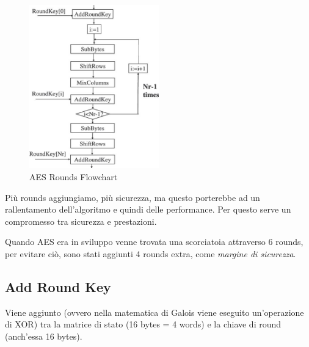 \begin{figure}[H]
	\centering
	\includegraphics[width=0.5\textwidth, height=0.5\textheight, keepaspectratio]{./images/aes/flowcharts/aes_flowchart.png}
	\caption{AES Rounds Flowchart}
	\label{fig:aes_flowchart2}
\end{figure}


\textsf{\small Più rounds aggiungiamo, più sicurezza, ma questo porterebbe ad un rallentamento dell'algoritmo e quindi delle performance.}
\textsf{\small Per questo serve un compromesso tra sicurezza e prestazioni.}

 

\textsf{\small Quando AES era in sviluppo venne trovata una scorciatoia attraverso 6 rounds, per evitare ciò, sono stati aggiunti 4 rounds extra, come \emph{margine di sicurezza}.} %

\subsection{Add Round Key}

    

\textsf{\small Viene aggiunto (ovvero nella matematica di Galois viene eseguito un'operazione di XOR) tra la matrice di stato (16 bytes = 4 words) e la chiave di round (anch'essa 16 bytes).}

